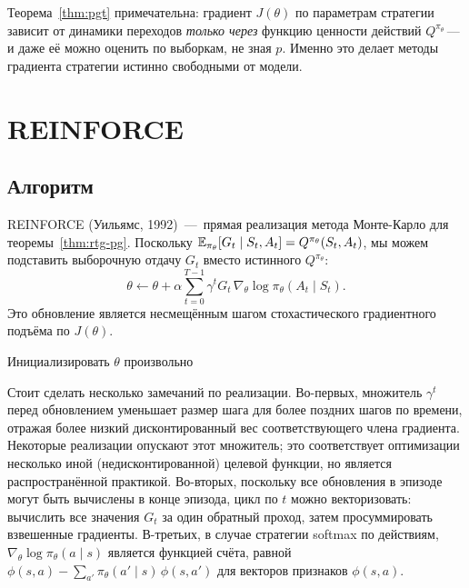 \begin{remark}
\label{rem:pgt-model-free}
Теорема~\ref{thm:pgt} примечательна: градиент $J(\theta)$ по параметрам стратегии зависит от динамики переходов \emph{только через} функцию ценности действий $Q^{\pi_\theta}$\,---\,и даже её можно оценить по выборкам, не зная $p$. Именно это делает методы градиента стратегии истинно свободными от модели.
\end{remark}

\section{REINFORCE}
\label{sec:reinforce}


\subsection{Алгоритм}

REINFORCE (Уильямс, 1992) \,---\, прямая реализация метода Монте-Карло для теоремы~\ref{thm:rtg-pg}. Поскольку $\operatorname{\mathbb{E}}_{\pi_\theta}[G_t \mid S_t, A_t] = Q^{\pi_\theta}(S_t, A_t)$, мы можем подставить выборочную отдачу $G_t$ вместо истинного $Q^{\pi_\theta}$:
\begin{equation}
\label{eq:reinforce-update}
\theta \leftarrow \theta + \alpha \sum_{t=0}^{T-1} \gamma^t G_t\, \nabla_\theta \log \pi_\theta(A_t \mid S_t).
\end{equation}
Это обновление является несмещённым шагом стохастического градиентного подъёма по $J(\theta)$.

\begin{algorithm}[ht]
\caption{REINFORCE (Уильямс, 1992)}
\label{alg:reinforce}
Инициализировать $\theta$ произвольно\;
\end{algorithm}

Стоит сделать несколько замечаний по реализации. Во-первых, множитель $\gamma^t$ перед обновлением уменьшает размер шага для более поздних шагов по времени, отражая более низкий дисконтированный вес соответствующего члена градиента. Некоторые реализации опускают этот множитель; это соответствует оптимизации несколько иной (недисконтированной) целевой функции, но является распространённой практикой. Во-вторых, поскольку все обновления в эпизоде могут быть вычислены в конце эпизода, цикл по $t$ можно векторизовать: вычислить все значения $G_t$ за один обратный проход, затем просуммировать взвешенные градиенты. В-третьих, в случае стратегии softmax по действиям, $\nabla_\theta \log \pi_\theta(a \mid s)$ является функцией счёта, равной $\phi(s,a) - \sum_{a'} \pi_\theta(a' \mid s)\, \phi(s,a')$ для векторов признаков $\phi(s,a)$.

